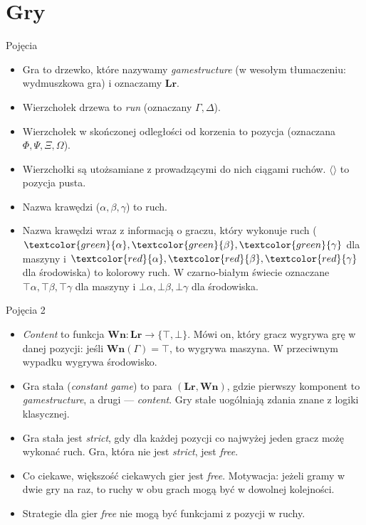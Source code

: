 \documentclass{beamer}
\begin{document}
\section{Gry}

\begin{frame}{Pojęcia}
\begin{itemize}
	\item Gra to drzewko, które nazywamy \textit{gamestructure} (w wesołym tłumaczeniu: wydmuszkowa gra) i oznaczamy $\textbf{Lr}$.
	\item Wierzchołek drzewa to \textit{run} (oznaczany $\Gamma, \Delta$).
	\item Wierzchołek w skończonej odległości od korzenia to pozycja (oznaczana $\Phi, \Psi, \Xi, \Omega$).
	\item Wierzchołki są utożsamiane z prowadzącymi do nich ciągami ruchów. $\langle\rangle$ to pozycja pusta.
	\item Nazwa krawędzi ($\alpha, \beta, \gamma$) to ruch.
	\item Nazwa krawędzi wraz z informacją o graczu, który wykonuje ruch ($\textcolor{green}{\alpha}, \textcolor{green}{\beta}, \textcolor{green}{\gamma}$ dla maszyny i $\textcolor{red}{\alpha}, \textcolor{red}{\beta}, \textcolor{red}{\gamma}$ dla środowiska) to kolorowy ruch. W czarno-białym świecie oznaczane $\top\alpha, \top\beta, \top\gamma$ dla maszyny i $\bot\alpha, \bot\beta, \bot\gamma$ dla środowiska.
\end{itemize}
\end{frame}

\begin{frame}{Pojęcia 2}
\begin{itemize}
	\item \textit{Content} to funkcja $\textbf{Wn}: \textbf{Lr} \to \{\top, \bot\}$. Mówi on, który gracz wygrywa grę w danej pozycji: jeśli $\textbf{Wn}(\Gamma) = \top$, to wygrywa maszyna. W przeciwnym wypadku wygrywa środowisko.
	\item Gra stała (\textit{constant game}) to para $(\textbf{Lr}, \textbf{Wn})$, gdzie pierwszy komponent to \textit{gamestructure}, a drugi — \textit{content}. Gry stałe uogólniają zdania znane z logiki klasycznej.
	\item Gra stała jest \textit{strict}, gdy dla każdej pozycji co najwyżej jeden gracz możę wykonać ruch. Gra, która nie jest \textit{strict}, jest \textit{free}.
	\item Co ciekawe, większość ciekawych gier jest \textit{free}. Motywacja: jeżeli gramy w dwie gry na raz, to ruchy w obu grach mogą być w dowolnej kolejności.
	\item Strategie dla gier \textit{free} nie mogą być funkcjami z pozycji w ruchy.
\end{itemize}
\end{frame}
\end{document}
